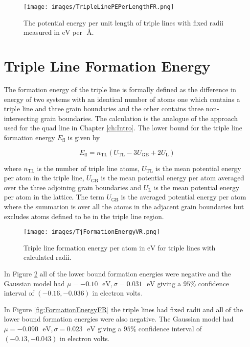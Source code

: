 \documentclass[12pt,a4paper,openany]{report}
\newcommand{\ts}[1]{\textrm{#1}}
\begin{document}
\begin{figure}[H]
\texttt{[image: images/TripleLinePEPerLengthFR.png]}  
	\caption{The potential energy per unit length of triple lines with fixed radii measured in $\ts{eV}$ per $\textrm{ \AA}$.}	
	\label{fig:PEPerLengthFR} 
\end{figure}


\newpage


\section{Triple Line Formation Energy} \label{sec:TLFE}


The formation energy of the triple line is formally defined as the difference in energy of two systems with an identical number of atoms one which contains a triple line and three grain boundaries and the other contains three non-intersecting grain boundaries. The calculation is the analogue of the approach used for the quad line in Chapter \ref{ch:Intro}. The lower bound for the triple line formation energy $E_{\ts{fl}}$ is given by

\[ E_{\ts{fl}} = n_{\ts{TL}}\left(U_{\ts{TL}} -3U_{\ts{GB}} + 2U_{\ts{L}} \right) \]
 
where $n_{\ts{TL}}$ is the number of triple line atoms, $U_{\ts{TL}}$ is the mean potential energy per atom in the triple line,  $U_{\ts{GB}}$ is the mean potential energy per atom averaged over the three adjoining grain boundaries and $U_{\ts{L}}$ is the mean potential energy per atom in the lattice. The term $U_{\ts{GB}}$ is the averaged potential energy per atom where the summation is over all the atoms in the adjacent grain boundaries but excludes atoms defined to be in the triple line region.
  

\begin{figure}[H]
	\texttt{[image: images/TjFormationEnergyVR.png]} 
	\caption{Triple line formation energy per atom in $\ts{eV}$ for triple lines with calculated radii.}
	\label{fig:FormationEnergyVR}
\end{figure}

In Figure \ref{fig:FormationEnergyVR} all of the lower bound formation energies were negative and the Gaussian model had  $\mu = -0.10 \text{ } \ts{eV}, \sigma = 0.031 \text{ } \ts{eV}$ giving a $95\%$ confidence interval of $(-0.16,  -0.036)$ in electron volts.

In Figure \ref{fig:FormationEnergyFR} the triple lines had fixed radii and all of the lower bound formation energies were also negative. The Gaussian model had  $\mu = -0.090 \text{ } \ts{eV}, \sigma = 0.023 \text{ } \ts{eV}$ giving a $95\%$ confidence interval of $(-0.13,  -0.043)$ in electron volts.
\end{document}
